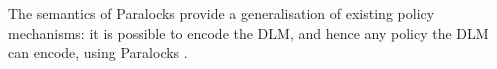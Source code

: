The semantics of Paralocks provide a generalisation of existing policy mechanisms: it is possible to encode the DLM, and hence any policy the DLM can encode, using Paralocks \cite{broberg2010paralocks}.
%
%
%
%
%
%
%
%

%
%
%
%
%




%
%


